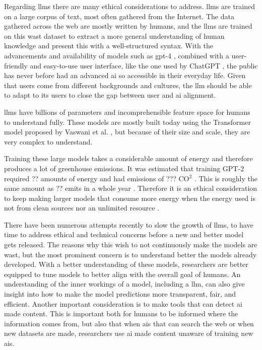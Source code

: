 Regarding \glspl{llm} there are many ethical considerations to address. \glspl{llm} are trained on a large corpus of text, most often gathered from the Internet. The data gathered across the web are mostly written by humans, and the \glspl{llm} are trained on this wast dataset to extract a more general understanding of human knowledge and present this with a well-structured syntax. With the advancements and availability of models such as \gls{gpt}-4 \cite{openaiGPT4TechnicalReport2023}, combined with a user-friendly and easy-to-use user interface, like the one used by ChatGPT \cite{ChatGPT}, the public has never before had an advanced \gls{ai} so accessible in their everyday life. Given that users come from different backgrounds and cultures, the \gls{llm} should be able to adapt to its users to close the gap between user and \gls{ai} alignment. 

\glspl{llm} have billions of parameters and incomprehensible feature space for humans to understand fully. These models are mostly built today using the Transformer model proposed by Vaswani et al. \cite{vaswaniAttentionAllYou2017}, but because of their size and scale, they are very complex to understand. 



Training these large models takes a considerable amount of energy and therefore produces a lot of greenhouse emissions. It was estimated that training GPT-2 required ?? amounts of energy and had emissions of ??? CO$^2$ \cite{??}. This is roughly the same amount as ?? emits in a whole year \cite{???}. Therefore it is an ethical consideration to keep making larger models that consume more energy when the energy used is not from clean sources nor an unlimited resource \cite{??}.

There have been numerous attempts recently to slow the growth of \glspl{llm}, to have time to address ethical and technical concerns before a new and better model gets released. The reasons why this wish to not continuously make the models are wast, but the most prominent concern is to understand better the models already developed. With a better understanding of these models, researchers are better equipped to tune models to better align with the overall goal of humans. An understanding of the inner workings of a model, including a \gls{llm}, can also give insight into how to make the model predictions more transparent, fair, and efficient. Another important consideration is to make tools that can detect \gls{ai} made content. This is important both for humans to be informed where the information comes from, but also that when \glspl{ai} that can search the web or when new datasets are made, researchers use \gls{ai} made content unaware of training new \glspl{ai}.  

